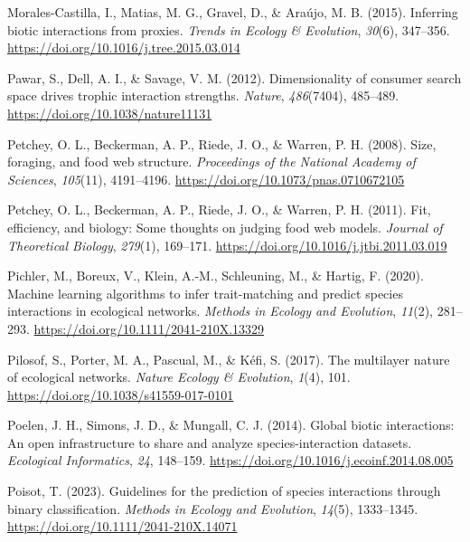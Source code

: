 \documentclass[
]{article}
\newlength{\cslhangindent}
\newenvironment{CSLReferences}[2] %
 {\begin{list}{}{%
  \setlength{\itemindent}{0pt}
  \setlength{\leftmargin}{0pt}
  \setlength{\parsep}{0pt}
  \ifodd #1
   \setlength{\leftmargin}{\cslhangindent}
   \setlength{\itemindent}{-1\cslhangindent}
  \fi
  \setlength{\itemsep}{#2\baselineskip}}}
 {\end{list}}
\begin{document}
\begin{CSLReferences}{1}{0}
Morales-Castilla, I., Matias, M. G., Gravel, D., \& Araújo, M. B.
(2015). Inferring biotic interactions from proxies. \emph{Trends in
Ecology \& Evolution}, \emph{30}(6), 347--356.
\url{https://doi.org/10.1016/j.tree.2015.03.014}

Pawar, S., Dell, A. I., \& Savage, V. M. (2012). Dimensionality of
consumer search space drives trophic interaction strengths.
\emph{Nature}, \emph{486}(7404), 485--489.
\url{https://doi.org/10.1038/nature11131}

Petchey, O. L., Beckerman, A. P., Riede, J. O., \& Warren, P. H. (2008).
Size, foraging, and food web structure. \emph{Proceedings of the
National Academy of Sciences}, \emph{105}(11), 4191--4196.
\url{https://doi.org/10.1073/pnas.0710672105}

Petchey, O. L., Beckerman, A. P., Riede, J. O., \& Warren, P. H. (2011).
Fit, efficiency, and biology: {Some} thoughts on judging food web
models. \emph{Journal of Theoretical Biology}, \emph{279}(1), 169--171.
\url{https://doi.org/10.1016/j.jtbi.2011.03.019}

Pichler, M., Boreux, V., Klein, A.-M., Schleuning, M., \& Hartig, F.
(2020). Machine learning algorithms to infer trait-matching and predict
species interactions in ecological networks. \emph{Methods in Ecology
and Evolution}, \emph{11}(2), 281--293.
\url{https://doi.org/10.1111/2041-210X.13329}

Pilosof, S., Porter, M. A., Pascual, M., \& Kéfi, S. (2017). The
multilayer nature of ecological networks. \emph{Nature Ecology \&
Evolution}, \emph{1}(4), 101.
\url{https://doi.org/10.1038/s41559-017-0101}

Poelen, J. H., Simons, J. D., \& Mungall, C. J. (2014). Global biotic
interactions: {An} open infrastructure to share and analyze
species-interaction datasets. \emph{Ecological Informatics}, \emph{24},
148--159. \url{https://doi.org/10.1016/j.ecoinf.2014.08.005}

Poisot, T. (2023). Guidelines for the prediction of species interactions
through binary classification. \emph{Methods in Ecology and Evolution},
\emph{14}(5), 1333--1345. \url{https://doi.org/10.1111/2041-210X.14071}


\end{CSLReferences}
\end{document}
